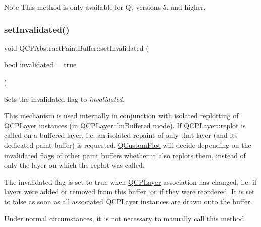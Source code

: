 \begin{DoxyNote}{Note}
This method is only available for Qt versions 5. and higher. 
\end{DoxyNote}
\mbox{\label{class_q_c_p_abstract_paint_buffer_ae4c7dc70dfc66be2879ce297b2b3d67f}} 
\subsubsection{\texorpdfstring{set\+Invalidated()}{setInvalidated()}}
{\footnotesize\ttfamily void Q\+C\+P\+Abstract\+Paint\+Buffer\+::set\+Invalidated (\begin{DoxyParamCaption}\item[{bool}]{invalidated = {\ttfamily true} }\end{DoxyParamCaption})}

Sets the invalidated flag to {\itshape invalidated}.

This mechanism is used internally in conjunction with isolated replotting of \hyperlink{class_q_c_p_layer}{Q\+C\+P\+Layer} instances (in \hyperlink{class_q_c_p_layer_a67dcfc1590be2a1f2227c5a39bb59c7cada274b1644a2a3c1b794c052f1601bb2}{Q\+C\+P\+Layer\+::lm\+Buffered} mode). If \hyperlink{class_q_c_p_layer_adefd53b6db02f470151c416f42e37180}{Q\+C\+P\+Layer\+::replot} is called on a buffered layer, i.\+e. an isolated repaint of only that layer (and its dedicated paint buffer) is requested, \hyperlink{class_q_custom_plot}{Q\+Custom\+Plot} will decide depending on the invalidated flags of other paint buffers whether it also replots them, instead of only the layer on which the replot was called.

The invalidated flag is set to true when \hyperlink{class_q_c_p_layer}{Q\+C\+P\+Layer} association has changed, i.\+e. if layers were added or removed from this buffer, or if they were reordered. It is set to false as soon as all associated \hyperlink{class_q_c_p_layer}{Q\+C\+P\+Layer} instances are drawn onto the buffer.

Under normal circumstances, it is not necessary to manually call this method. \mbox{\label{class_q_c_p_abstract_paint_buffer_a8b68c3cd36533f1a4a23b5ce8cd66f01}} 
